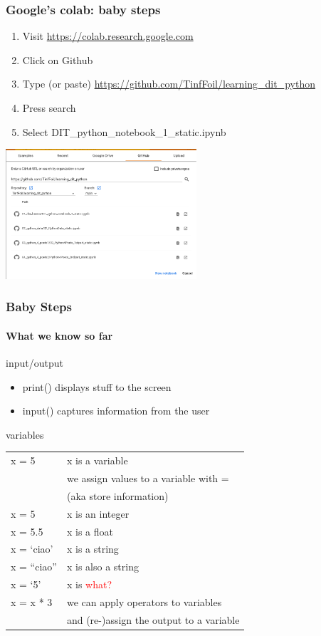 \documentclass{beamer}
\newcommand{\red}[1]{\textcolor{red}{#1}}
\begin{document}
\begin{frame}
\frametitle{Google’s colab: baby steps}

\begin{enumerate}
\item Visit \url{https://colab.research.google.com}
\item Click on Github
\item Type (or paste) \url{https://github.com/TinfFoil/learning_dit_python}
\item Press search
\item Select 
\alert{DIT\_python\_notebook\_1\_static.ipynb}
\end{enumerate}

\begin{center}
 \includegraphics[width=71mm]{img/colab_git_import.png}
\end{center}
\end{frame}

\begin{frame}
\frametitle{Baby Steps}
\framesubtitle{What we know so far}

\alert{input/output}

\begin{itemize}
\item print() displays stuff to the screen
\item input() captures information from the user
\end{itemize}										\pause 

\alert{variables}
\medskip

\centering
\begin{tabular}{ll}\hline
x = 5		& x is a variable	\\
			& we assign values to a variable with = 	\\
			& (aka store information)					\\\hline	\pause 

x = 5		& x is an integer	\\
x = 5.5		& x is a float	\\
x = ‘ciao’	& x is a string	\\
x = “ciao”	& x is also a string	\\
x = ‘5’		& x is \red{what?}	\\				\hline	\pause 
 
x  = x * 3	& we can apply operators to variables	\\
			& and (re-)assign the output to a variable	\\	\hline

\end{tabular}
\end{frame}
\end{document}
